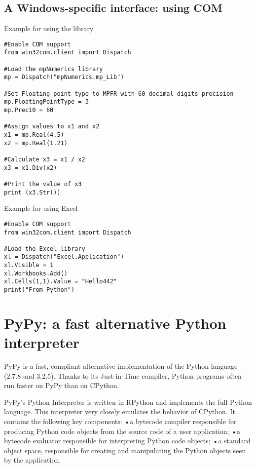 \subsection{A Windows-specific interface: using COM}
\vpara
Example for using the library

\begin{lstlisting}
#Enable COM support
from win32com.client import Dispatch

#Load the mpNumerics library
mp = Dispatch("mpNumerics.mp_Lib")

#Set Floating point type to MPFR with 60 decimal digits precision
mp.FloatingPointType = 3
mp.Prec10 = 60

#Assign values to x1 and x2
x1 = mp.Real(4.5)
x2 = mp.Real(1.21)

#Calculate x3 = x1 / x2
x3 = x1.Div(x2)

#Print the value of x3
print (x3.Str())
\end{lstlisting}

\vpara
Example for using Excel

\begin{lstlisting}
#Enable COM support
from win32com.client import Dispatch

#Load the Excel library
xl = Dispatch("Excel.Application")
xl.Visible = 1
xl.Workbooks.Add() 
xl.Cells(1,1).Value = "Hello442" 
print("From Python")
\end{lstlisting}




\newpage
\section{PyPy: a fast alternative Python interpreter}


PyPy is a fast, compliant alternative implementation of the Python language (2.7.8 and 3.2.5). Thanks to its Just-in-Time compiler, Python programs often run faster on PyPy than on CPython.

PyPy’s Python Interpreter is written in RPython and implements the full Python language. This interpreter very closely emulates the behavior of CPython. It contains the following key components:
•a bytecode compiler responsible for producing Python code objects from the source code of a user application;
•a bytecode evaluator responsible for interpreting Python code objects;
•a standard object space, responsible for creating and manipulating the Python objects seen by the application.


